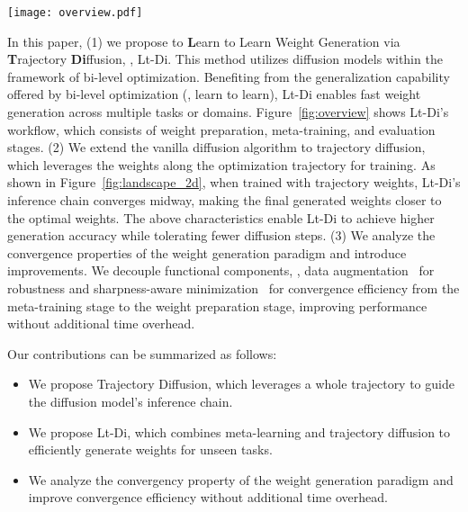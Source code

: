 \begin{figure*}[t]
    \centering
    \texttt{[image: overview.pdf]}
    \caption{Workflow of Lt-Di. In the weights preparation stage, it updates $\theta^h$ and constructs the optimization trajectory $Tra_i=\{\theta^h_m, ... ,\theta^h_0\}$ for each task $T_i$. In the meta-training stage, it uses $r(\cdot)$ to map optimization trajectory to the inference chain $C_{infer}=\{x_T,...,x_0\}$ for diffusion learning. In the inner-loop of meta-learning, it performs trajectory diffusion and decouples functional components into the weight preparation stage for efficiency. In the evaluation stage, it uses the well-trained denoise $\phi^*$ to generate optimal weights $\theta^{h^*}$ for unseen task $T_{n+1}$ without gradient computation. The red rectangle shows that trajectory diffusion is an extended version of vanilla diffusion with more observed data and loss functions.}
    \label{fig:overview}
\end{figure*} 

In this paper, (1) we propose to \textbf{L}earn to Learn Weight Generation via \textbf{T}rajectory \textbf{Di}ffusion, \ie, Lt-Di. This method utilizes diffusion models within the framework of bi-level optimization. Benefiting from the generalization capability offered by bi-level optimization (\ie, learn to learn), Lt-Di enables fast weight generation across multiple tasks or domains. Figure~\ref{fig:overview} shows Lt-Di's workflow, which consists of weight preparation, meta-training, and evaluation stages. (2) We extend the vanilla diffusion algorithm to trajectory diffusion, which leverages the weights along the optimization trajectory for training. As shown in Figure~\ref{fig:landscape_2d}, when trained with trajectory weights, Lt-Di's inference chain converges midway, making the final generated weights closer to the optimal weights. The above characteristics enable Lt-Di to achieve higher generation accuracy while tolerating fewer diffusion steps. (3) We analyze the convergence properties of the weight generation paradigm and introduce improvements. We decouple functional components, \ie, data augmentation~\cite{survey_neural} for robustness and sharpness-aware minimization~\cite{SAM} for convergence efficiency from the meta-training stage to the weight preparation stage, improving performance without additional time overhead. 

Our contributions can be summarized as follows:
\begin{itemize}
    \item We propose Trajectory Diffusion, which leverages a whole trajectory to guide the diffusion model's inference chain.
    \item We propose Lt-Di, which combines meta-learning and trajectory diffusion to efficiently generate weights for unseen tasks.
    \item We analyze the convergency property of the weight generation paradigm and improve convergence efficiency without additional time overhead.
\end{itemize}




